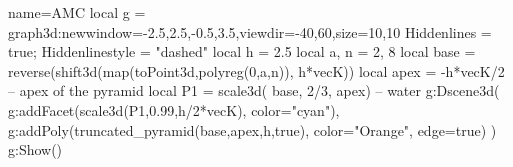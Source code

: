 \documentclass[12pt]{standalone}
\begin{document}
\begin{luadraw}{name=AMC}
local g = graph3d:new{window={-2.5,2.5,-0.5,3.5},viewdir={-40,60},size={10,10}}
Hiddenlines = true; Hiddenlinestyle = "dashed"
local h = 2.5
local a, n = 2, 8
local base = reverse(shift3d(map(toPoint3d,polyreg(0,a,n)), h*vecK))
local apex = -h*vecK/2 -- apex of the pyramid
local P1 = scale3d( base, 2/3, apex) -- water
g:Dscene3d(
    g:addFacet(scale3d(P1,0.99,h/2*vecK), {color="cyan"}),
    g:addPoly(truncated_pyramid(base,apex,h,true), {color="Orange", edge=true})
)
g:Show()
\end{luadraw}
\end{document}
